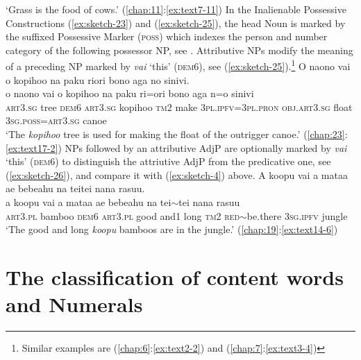 \documentclass[output=paper]{langscibook}
\begin{document}
    \glt `Grass is the food of cows.' (\ref{chap:11}:\ref{ex:text7-11})
\z
In the Inalienable Possessive Constructions (\ref{ex:sketch-23}) and (\ref{ex:sketch-25}), the head Noun is marked by the suffixed Possessive Marker (\textsc{poss}) which indexes the person and number category of the following possessor NP, see .
Attributive NPs modify the meaning of a preceding NP marked by \textit{vai} `this' (\textsc{dem}6), see (\ref{ex:sketch-25}).\footnote{Similar examples are (\ref{chap:6}:\ref{ex:text2-2}) and (\ref{chap:7}:\ref{ex:text3-4})}
\ea\label{ex:sketch-25}
    O naono vai o kopihoo na paku riori bono aga no sinivi.\\
    \gll o	naono	vai	o	kopihoo	na	paku	ri=ori	bono	aga	n=o	sinivi\\
    \textsc{art}3.\textsc{sg}	tree	\textsc{dem}6	\textsc{art}3.\textsc{sg}	kopihoo	\textsc{tm}2	make	3\textsc{pl}.\textsc{ipfv}=3\textsc{pl}.\textsc{pron}	\textsc{obj}.\textsc{art}3.\textsc{sg}	float	3\textsc{sg}.\textsc{poss}=\textsc{art}3.\textsc{sg}	canoe\\
    \glt `The \textit{kopihoo} tree is used for making the float of the outrigger canoe.' (\ref{chap:23}:\ref{ex:text17-2})
\z
NPs followed by an attributive AdjP are optionally marked by \textit{vai} `this' (\textsc{dem}6) to distinguish the attriutive AdjP from the predicative one, see (\ref{ex:sketch-26}), and compare it with (\ref{ex:sketch-4}) above.
\ea\label{ex:sketch-26}
    A koopu vai a mataa ae bebeahu na teitei nana rasuu.\\
    \gll a	koopu	vai	a	mataa	ae	bebeahu	na	tei{$\sim$}tei	nana	rasuu\\
    \textsc{art}3.\textsc{pl}	bamboo	\textsc{dem}6	\textsc{art}3.\textsc{pl}	good	and1	long	\textsc{tm}2	\textsc{red}{$\sim$}be.there	3\textsc{sg}.\textsc{ipfv}	jungle\\
    \glt `The good and long \textit{koopu} bamboos are in the jungle.' (\ref{chap:19}:\ref{ex:text14-6})
\z
\section{The classification of content words and Numerals}\label{sec:numerals}
\end{document}
